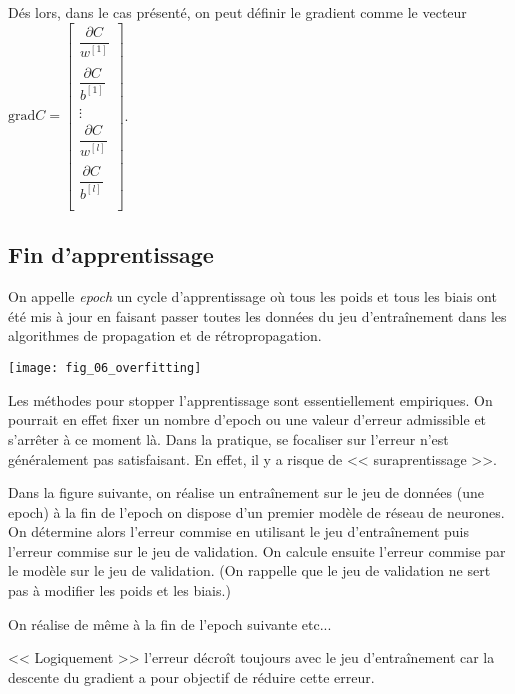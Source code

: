 \begin{defi}[Gradient]
Dés lors, dans le cas présenté, on peut définir le gradient comme le vecteur
$\text{grad} C = \begin{bmatrix}
\dfrac{\partial C}{w^{[1]}_{}} \\
\dfrac{\partial C}{b^{[1]}_{}} \\
\vdots
\\
\dfrac{\partial C}{w^{[l]}_{}} \\
\dfrac{\partial C}{b^{[l]}_{}} \\

\end{bmatrix}
$.

\end{defi}

\subsection{Fin d'apprentissage}

\begin{defi}[Epoch]
On appelle \textit{epoch} un cycle d'apprentissage où tous les poids et tous les biais ont été mis à jour en faisant passer toutes les données du jeu d’entraînement dans les algorithmes de propagation et de rétropropagation.
\end{defi}


\begin{marginfigure}
\texttt{[image: fig\_06\_overfitting]}
\end{marginfigure}

Les méthodes pour stopper l'apprentissage sont essentiellement empiriques. On pourrait en effet fixer un nombre d'epoch ou une valeur d'erreur admissible et s'arrêter à ce moment là. Dans la pratique, se focaliser sur l'erreur n'est généralement pas satisfaisant. En effet, il y a risque de << suraprentissage >>.


Dans la figure suivante, on réalise un entraînement sur le jeu de données (une epoch) à la fin de l'epoch on dispose d'un premier modèle de réseau de neurones.  On détermine alors l'erreur commise en utilisant le jeu d'entraînement puis l'erreur commise sur le jeu de validation.  On calcule ensuite l'erreur commise par le modèle sur le jeu de validation. (On rappelle que le jeu de validation ne sert pas à modifier les poids et les biais.)

On réalise de même à la fin de l'epoch suivante etc...

<< Logiquement >> l'erreur décroît toujours avec le jeu d’entraînement car la descente du gradient a pour objectif de réduire cette erreur. 

